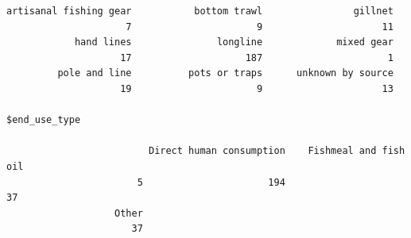 \documentclass[
]{article}
\newenvironment{Shaded}{\begin{snugshade}}{\end{snugshade}}
\newcommand{\CommentTok}[1]{\textcolor[rgb]{0.37,0.37,0.37}{#1}}
\newcommand{\DecValTok}[1]{\textcolor[rgb]{0.68,0.00,0.00}{#1}}
\newcommand{\FloatTok}[1]{\textcolor[rgb]{0.68,0.00,0.00}{#1}}
\newcommand{\NormalTok}[1]{\textcolor[rgb]{0.00,0.23,0.31}{#1}}
\newcommand{\OtherTok}[1]{\textcolor[rgb]{0.00,0.23,0.31}{#1}}
\newcommand{\SpecialCharTok}[1]{\textcolor[rgb]{0.37,0.37,0.37}{#1}}
\begin{document}
\begin{verbatim}
artisanal fishing gear           bottom trawl                gillnet 
                     7                      9                     11 
            hand lines               longline             mixed gear 
                    17                    187                      1 
         pole and line          pots or traps      unknown by source 
                    19                      9                     13 

$end_use_type

                         Direct human consumption    Fishmeal and fish oil 
                       5                      194                       37 
                   Other 
                      37 
\end{verbatim}

\begin{Shaded}
\end{Shaded}
\end{document}
